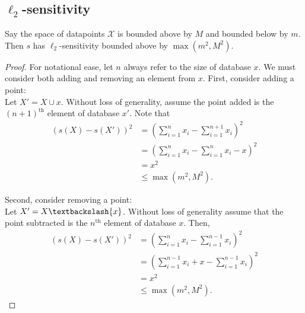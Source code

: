 \documentclass[11pt]{scrartcl} %
\begin{document}
\subsection{$\ell_2$-sensitivity}

\begin{theorem}
Say the space of datapoints $\mathcal{X}$ is bounded above by $M$ and bounded below by $m$. Then $s$ has $\ell_2$-sensitivity bounded above by $\max(m^2, M^2).$
\end{theorem}

\begin{proof}
For notational ease, let $n$ always refer to the size of database $x$. We must consider both adding and removing an element from $x$. First, consider adding a point:\\

Let $X' = X \cup {x}$. Without loss of generality, assume the point added is the $(n+1)^{\text{th}}$ element of database $x'$. Note that
\begin{align*}
\left(s(X) - s(X') \right)^2 &= \left( \sum_{i=1}^n x_i - \sum_{i=1}^{n+1} x_i \right)^2 \\
	&= \left( \sum_{i=1}^n x_i - \sum_{i=1}^n x_i - x \right)^2 \\
	&= x^2 \\
	&\le \max(m^2, M^2).
\end{align*}

Second, consider removing a point: \\
Let $X' = X\textbackslash\{x\}$. Without loss of generality assume that the point subtracted is the $n^{\text{th}}$ element of database $x$. Then,
\begin{align*}
\left(s(X) - s(X') \right)^2 &= \left( \sum_{i=1}^n x_i - \sum_{i=1}^{n-1} x_i \right)^2 \\
	&= \left( \sum_{i=1}^{n-1} x_i + x - \sum_{i=1}^{n-1} x_i \right)^2 \\
	 &=x^2 \\
	 &\le \max(m^2, M^2).
\end{align*}
\end{proof}

% 
% 
\end{document}
